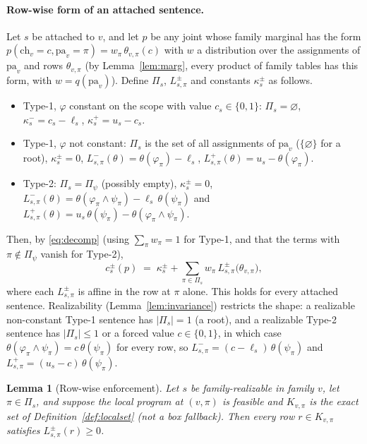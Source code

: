 \documentclass{article} %
\newtheorem{lemma}{Lemma}
\newcommand{\ch}{\mathrm{ch}}
\newcommand{\pa}{\mathrm{pa}}
\begin{document}
\paragraph{Row-wise form of an attached sentence.} Let $s$ be attached to $v$, and let $p$ be any
joint whose family marginal has the form $p(\ch_v{=}c,\pa_v{=}\pi)=w_\pi\,\theta_{v,\pi}(c)$ with $w$
a distribution over the assignments of $\pa_v$ and rows $\theta_{v,\pi}$ (by Lemma~\ref{lem:marg},
every product of family tables has this form, with $w=q(\pa_v)$). Define $\Pi_s$, $L^\pm_{s,\pi}$ and
constants $\kappa_s^\pm$ as follows.
\begin{itemize}
  \item Type-1, $\varphi$ constant on the scope with value $c_s\in\{0,1\}$: $\Pi_s=\varnothing$,
    $\kappa_s^-=c_s-\ell_s$, $\kappa_s^+=u_s-c_s$.
  \item Type-1, $\varphi$ not constant: $\Pi_s$ is the set of all assignments of $\pa_v$ ($\{\varnothing\}$
    for a root), $\kappa_s^\pm=0$, $L^-_{s,\pi}(\theta)=\theta(\varphi_\pi)-\ell_s$,
    $L^+_{s,\pi}(\theta)=u_s-\theta(\varphi_\pi)$.
  \item Type-2: $\Pi_s=\Pi_\psi$ (possibly empty), $\kappa_s^\pm=0$,
    $L^-_{s,\pi}(\theta)=\theta(\varphi_\pi\wedge\psi_\pi)-\ell_s\,\theta(\psi_\pi)$ and
    $L^+_{s,\pi}(\theta)=u_s\,\theta(\psi_\pi)-\theta(\varphi_\pi\wedge\psi_\pi)$.
\end{itemize}
Then, by \eqref{eq:decomp} (using $\sum_\pi w_\pi=1$ for Type-1, and that the terms with
$\pi\notin\Pi_\psi$ vanish for Type-2),
\begin{equation}\label{eq:rowwise}
  c_s^\pm(p)\;=\;\kappa_s^\pm+\sum_{\pi\in\Pi_s}w_\pi\,L^{\pm}_{s,\pi}\bigl(\theta_{v,\pi}\bigr),
\end{equation}
where each $L^{\pm}_{s,\pi}$ is affine in the row at $\pi$ alone. This holds for every attached
sentence. Realizability (Lemma~\ref{lem:invariance}) restricts the shape: a realizable non-constant
Type-1 sentence has $|\Pi_s|=1$ (a root), and a realizable Type-2 sentence has $|\Pi_s|\le1$ or a
forced value $c\in\{0,1\}$, in which case $\theta(\varphi_\pi\wedge\psi_\pi)=c\,\theta(\psi_\pi)$ for
every row, so $L^-_{s,\pi}=(c-\ell_s)\,\theta(\psi_\pi)$ and $L^+_{s,\pi}=(u_s-c)\,\theta(\psi_\pi)$.

\begin{lemma}[Row-wise enforcement]\label{lem:noGapA}
Let $s$ be family-realizable in family $v$, let $\pi\in\Pi_s$, and suppose the local program at
$(v,\pi)$ is feasible and $K_{v,\pi}$ is the exact set of Definition~\ref{def:localset} (not a box
fallback). Then every row $r\in K_{v,\pi}$ satisfies $L^\pm_{s,\pi}(r)\ge0$.
\end{lemma}
\end{document}
